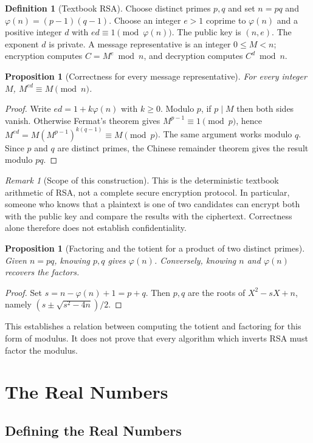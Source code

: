 \documentclass{article}
\newtheorem{proposition}[theorem]{Proposition}
\theoremstyle{definition}
\newtheorem{definition}[theorem]{Definition}
\theoremstyle{remark}
\newtheorem{remark}[theorem]{Remark}
\begin{document}
\begin{definition}[Textbook RSA]
Choose distinct primes $p,q$ and set $n=pq$ and $\varphi(n)=(p-1)(q-1)$.
Choose an integer $e>1$ coprime to $\varphi(n)$ and a positive integer $d$ with $ed\equiv1\pmod{\varphi(n)}$.
The public key is $(n,e)$. The exponent $d$ is private. A message representative is an integer $0\leq M<n$; encryption computes $C=M^e\bmod n$, and decryption computes $C^d\bmod n$.
\end{definition}
\begin{proposition}[Correctness for every message representative]
For every integer $M$, $M^{ed}\equiv M\pmod n$.
\end{proposition}
\begin{proof}
Write $ed=1+k\varphi(n)$ with $k\geq0$. Modulo $p$, if $p\mid M$ then both sides vanish. Otherwise Fermat's theorem gives $M^{p-1}\equiv1\pmod p$, hence $M^{ed}=M(M^{p-1})^{k(q-1)}\equiv M\pmod p$.
The same argument works modulo $q$. Since $p$ and $q$ are distinct primes, the Chinese remainder theorem gives the result modulo $pq$.
\end{proof}
\begin{remark}[Scope of this construction]
This is the deterministic textbook arithmetic of RSA, not a complete secure encryption protocol. In particular, someone who knows that a plaintext is one of two candidates can encrypt both with the public key and compare the results with the ciphertext. Correctness alone therefore does not establish confidentiality.
\end{remark}
\begin{proposition}[Factoring and the totient for a product of two distinct primes]
Given $n=pq$, knowing $p,q$ gives $\varphi(n)$. Conversely, knowing $n$ and $\varphi(n)$ recovers the factors.
\end{proposition}
\begin{proof}
Set $s=n-\varphi(n)+1=p+q$. Then $p,q$ are the roots of $X^2-sX+n$, namely $(s\pm\sqrt{s^2-4n})/2$.
\end{proof}
This establishes a relation between computing the totient and factoring for this form of modulus. It does not prove that every algorithm which inverts RSA must factor the modulus.
\section{The Real Numbers}
\label{sec:real-numbers}

\subsection{Defining the Real Numbers}
\label{sec:defining-real-numbers}
\end{document}
